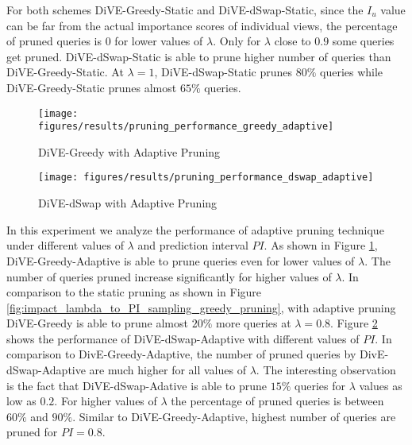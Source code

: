 For both schemes DiVE-Greedy-Static and DiVE-dSwap-Static, since the $I_u$ value can be far from the actual importance scores of individual views, the percentage of pruned queries is $0$ for lower values of $\lambda$. Only for $\lambda$ close to $0.9$ some queries get pruned. DiVE-dSwap-Static  is able to prune higher number of queries than DiVE-Greedy-Static. At $\lambda=1$, DiVE-dSwap-Static prunes $80\%$ queries while DiVE-Greedy-Static prunes almost $65\%$ queries. 


\begin{figure}[t]
	\texttt{[image: figures/results/pruning\_performance\_greedy\_adaptive]}
			\vspace{-15pt}
	\caption{DiVE-Greedy with Adaptive Pruning}%
	\label{fig:pruning_performance_greedy}
		\vspace{-6pt}
\end{figure}

\begin{figure}[t]
	\texttt{[image: figures/results/pruning\_performance\_dswap\_adaptive]}
				\vspace{-15pt}
	\caption{DiVE-dSwap with Adaptive Pruning}%
	\label{fig:impact_lambda_to_PI_sampling_swapd_pruning}
	\vspace{-6pt}
\end{figure}



{}
In this experiment we analyze the performance of adaptive pruning technique under different values of $\lambda$ and prediction interval $PI$. As shown in Figure \ref{fig:pruning_performance_greedy}, DiVE-Greedy-Adaptive is able to prune queries even for lower values of $\lambda$. The number of queries pruned increase significantly for higher values of $\lambda$. In comparison to the static pruning as shown in Figure \ref{fig:impact_lambda_to_PI_sampling_greedy_pruning}, with adaptive pruning DiVE-Greedy is able to prune almost $20\%$ more queries at $\lambda = 0.8$. Figure \ref{fig:impact_lambda_to_PI_sampling_swapd_pruning} shows the performance of DiVE-dSwap-Adaptive with different values of $ PI $. In comparison to DivE-Greedy-Adaptive, the number of pruned queries by DivE-dSwap-Adaptive are much higher for all values of $\lambda$. The interesting observation is the fact that DiVE-dSwap-Adative is able to prune $15\%$ queries for $\lambda$ values as low as $0.2$. For higher values of $\lambda$ the percentage of pruned queries is between $60\%$ and $90\%$. Similar to DiVE-Greedy-Adaptive, highest number of queries are pruned for $PI=0.8$. 
	
